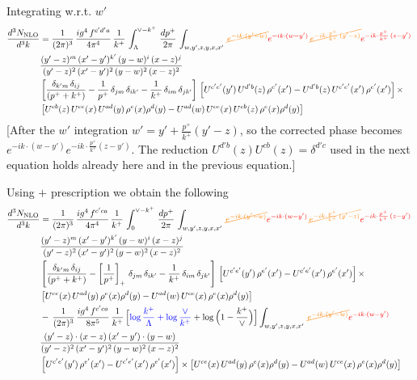 \documentclass[9pt]{article}
\numberwithin{equation}{section}
\begin{document}
Integrating w.r.t. $w'$
\begin{align}
     \frac{d^{3}N_{\rm NLO}}{d^{3}k} & = \frac{1}{(2\pi)^{3}}\, \frac{ig^{4}\,f^{c'd'a}}{4\pi^{4}}\, \frac{1}{k^{+}}\,\int_{\Lambda}^{\vee-k^{+}}\, \frac{dp^{+}}{2\pi}\, \int_{w,y',z,y,x,x'}\, {\color{orange}\cancel{e^{-ik\cdot (y'-w)}}}{\color{red}e^{-ik\cdot (w-y')}}\, {\color{orange}\cancel{e^{-ik\cdot \frac{p^{+}}{k^{+}}\,(y'-z)}}}{\color{red}e^{-ik\cdot \frac{p^{+}}{k^{+}}\,(z-y')}}\,\notag \\ & \frac{(y'-z)^{m}\,(x'-y')^{k'}\,(y-w)^{i}\,(x-z)^{j}}{(y'-z)^{2}\,(x'-y')^{2}\,(y-w)^{2}\,(x-z)^{2}}\notag \\ & \left[\frac{\delta_{k'm}\,\delta_{ij}}{(p^{+}+k^{+})}-\frac{1}{p^{+}}\,\delta_{jm}\,\delta_{ik'}-\frac{1}{k^{+}}\, \delta_{im}\, \delta_{jk'}\right]\, \left[U^{c'e'}(y')\,U^{d'b}(z)\,\rho^{e'}(x')-U^{d'b}(z)\,U^{c'e'}(x')\,\rho^{e'}(x')\right]\times\notag \\ &  \left[U^{cb}(z)\,U^{ce}(x)\,U^{ad}(y)\,\rho^{e}(x)\rho^{d}(y)-U^{ad}(w)\,U^{ce}(x)\,U^{cb}(z)\,\rho^{e}(x)\rho^{d}(y)\right]
\end{align} {\color{red}[After the $w'$ integration $w'=y'+\frac{p^{+}}{k^{+}}(y'-z)$, so the corrected phase becomes $e^{-ik\cdot(w-y')}e^{-ik\cdot\frac{p^{+}}{k^{+}}(z-y')}$. The reduction $U^{d'b}(z)U^{cb}(z)=\delta^{d'c}$ used in the next equation holds already here and in the previous equation.]}\par\noindent 
Using $+$ prescription we obtain the following
\begin{align}
    \frac{d^{3}N_{\rm NLO}}{d^{3}k} & = \frac{1}{(2\pi)^{3}}\, \frac{ig^{4}\,f^{c'ca}}{4\pi^{4}}\, \frac{1}{k^{+}}\,\int_{0}^{\vee-k^{+}}\, \frac{dp^{+}}{2\pi}\, \int_{w,y',z,y,x,x'}\, {\color{orange}\cancel{e^{-ik\cdot (y'-w)}}}{\color{red}e^{-ik\cdot (w-y')}}\, {\color{orange}\cancel{e^{-ik\cdot \frac{p^{+}}{k^{+}}\,(y'-z)}}}{\color{red}e^{-ik\cdot \frac{p^{+}}{k^{+}}\,(z-y')}}\,\notag \\ & \frac{(y'-z)^{m}\,(x'-y')^{k'}\,(y-w)^{i}\,(x-z)^{j}}{(y'-z)^{2}\,(x'-y')^{2}\,(y-w)^{2}\,(x-z)^{2}}\notag \\ & \left[\frac{\delta_{k'm}\,\delta_{ij}}{(p^{+}+k^{+})}-\left[\frac{1}{p^{+}}\right]_{+}\,\delta_{jm}\,\delta_{ik'}-\frac{1}{k^{+}}\, \delta_{im}\, \delta_{jk'}\right]\, \left[U^{c'e'}(y')\,\rho^{e'}(x')-U^{c'e'}(x')\,\rho^{e'}(x')\right]\times \notag \\ &  \left[U^{ce}(x)\,U^{ad}(y)\,\rho^{e}(x)\rho^{d}(y)-U^{ad}(w)\,U^{ce}(x)\,\rho^{e}(x)\rho^{d}(y)\right]\notag \\ & -\,\frac{1}{(2\pi)^{3}}\, \frac{ig^{4}\,f^{c'ca}}{8\pi^{5}}\, \frac{1}{k^{+}}\,\Big[{\color{blue}\log\frac{k^{+}}{\Lambda}+\log\frac{\vee}{k^{+}}}+\log\Big(1-\frac{k^{+}}{\vee}\Big)\Big] \int_{w,y',z,y,x,x'}\, {\color{orange}\cancel{e^{-ik\cdot (y'-w)}}}{\color{red}e^{-ik\cdot (w-y')}}\,\notag \\ & \frac{(y'-z)\cdot (x-z)\,(x'-y')\cdot (y-w)}{(y'-z)^{2}\,(x'-y')^{2}\,(y-w)^{2}\,(x-z)^{2}}\notag \\ & \left[U^{c'e'}(y')\,\rho^{e'}(x')-U^{c'e'}(x')\,\rho^{e'}(x')\right]\times  \left[U^{ce}(x)\,U^{ad}(y)\,\rho^{e}(x)\rho^{d}(y)-U^{ad}(w)\,U^{ce}(x)\,\rho^{e}(x)\rho^{d}(y)\right]
\end{align}
\end{document}
